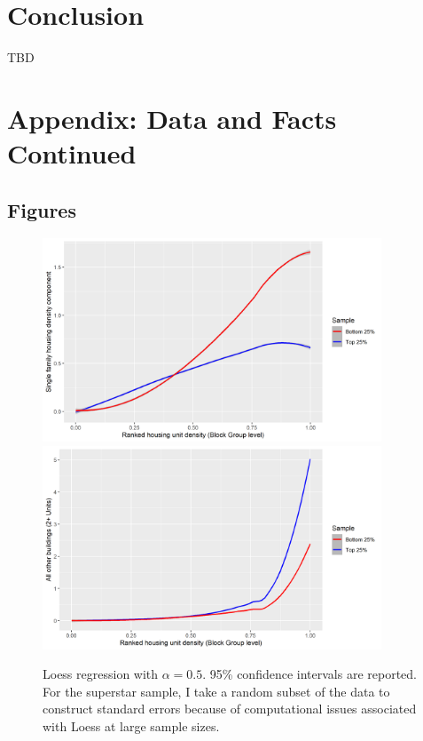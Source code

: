 \documentclass[]{article}
\begin{document}


\section{Conclusion}
TBD

\newpage
\scriptsize


\newpage
\newpage
\appendix
\section{Appendix: Data and Facts Continued}\label{DataandFactsContinued}

\subsection{Figures}
\begin{figure}[hbpt]
\begin{center}
	\includegraphics[width=0.9\textwidth]{singlefamily_dist.png}
	\includegraphics[width=0.9\textwidth]{2plusbuilding_dist.png}
	\caption{Loess regression with $\alpha = 0.5$. 95\% confidence intervals are reported. For the superstar sample, I take a random subset of the data to construct standard errors because of computational issues associated with Loess at large sample sizes.}\label{SingleFMargin}
\end{center}
\end{figure}
\end{document}
